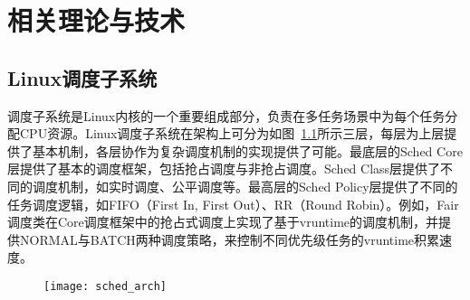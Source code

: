 \chapter{相关理论与技术}\label{chap:theories_tech}

\section{Linux调度子系统}


调度子系统是Linux内核的一个重要组成部分，负责在多任务场景中为每个任务分配CPU资源。Linux调度子系统在架构上可分为如图~\ref{fig:sched_arch}所示三层，每层为上层提供了基本机制，各层协作为复杂调度机制的实现提供了可能。最底层的Sched Core层提供了基本的调度框架，包括抢占调度与非抢占调度。Sched Class层提供了不同的调度机制，如实时调度、公平调度等。最高层的Sched Policy层提供了不同的任务调度逻辑，如FIFO（First In, First Out）、RR（Round Robin）。例如，Fair调度类在Core调度框架中的抢占式调度上实现了基于vruntime的调度机制，并提供NORMAL与BATCH两种调度策略，来控制不同优先级任务的vruntime积累速度。

\begin{figure}[!htbp]
    \centering
    \texttt{[image: sched\_arch]}
    \label{fig:sched_arch}
\end{figure}

